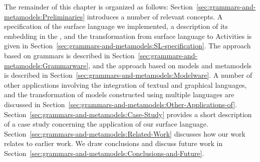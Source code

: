 The remainder of this chapter is organized as follows: Section~\ref{sec:grammars-and-metamodels:Preliminaries} introduces a number of relevant concepts.
A specification of the surface language we implemented, a description of its embedding in the \UML, and the transformation from surface language to Activities is given in Section~\ref{sec:grammars-and-metamodels:SL-specification}.
The approach based on grammars is described in Section~\ref{sec:grammars-and-metamodels:Grammarware}, and the approach based on models and metamodels is described in Section~\ref{sec:grammars-and-metamodels:Modelware}.
A number of other applications involving the integration of textual and graphical languages, and the transformation of models constructed using multiple languages are discussed in Section~\ref{sec:grammars-and-metamodels:Other-Applications-of}.
Section~\ref{sec:grammars-and-metamodels:Case-Study} provides a short description of a case study concerning the application of our surface language.
Section~\ref{sec:grammars-and-metamodels:Related-Work} discusses how our work relates to earlier work.
We draw conclusions and discuss future work in Section~\ref{sec:grammars-and-metamodels:Conclusions-and-Future}.
